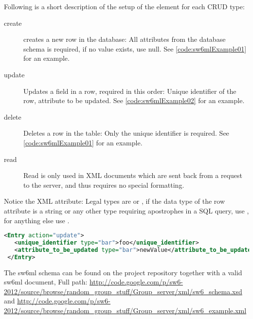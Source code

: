 Following is a short description of the setup of the  element for each CRUD type:

\begin{description}
 \item[create] creates a new row in the database: All attributes from the database schema is required, if no value exists, use null. See \autoref{code:sw6mlExample01} for an example.
 \item[update] Updates a field in a row, required in this order: Unique identifier of the row, attribute to be updated. See \autoref{code:sw6mlExample02} for an example.
 \item[delete] Deletes a row in the table: Only the unique identifier is required. See \autoref{code:sw6mlExample01} for an example.
 \item[read]   Read is only used in XML documents which are sent back from a request to the server, and thus requires no special formatting.
\end{description}

Notice the  XML attribute: Legal types are  or , if the data type of the row attribute is a string or any other type requiring apostrophes
in a SQL query, use , for anything else use .

\begin{Code}
\begin{lstlisting}[label=code:sw6mlExample02,language=XML,caption=sw6ml update syntax example]
 <Entry action="update">
   <unique_identifier type="bar">foo</unique_identifier>
   <attribute_to_be_updated type="bar">newValue</attribute_to_be_updated>
 </Entry>
\end{lstlisting}
\end{Code}

The sw6ml schema can be found on the project repository together with a valid sw6ml document,
Full path: \url{http://code.google.com/p/sw6-2012/source/browse/random_group_stuff/Group_server/xml/sw6_schema.xsd}
and \url{http://code.google.com/p/sw6-2012/source/browse/random_group_stuff/Group_server/xml/sw6_example.xml} %